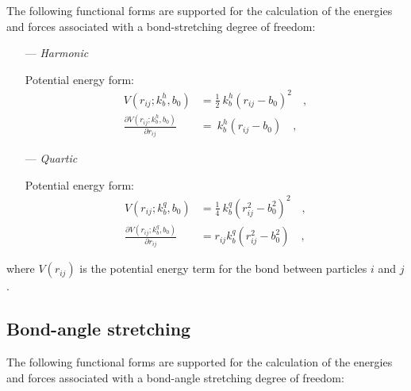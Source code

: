 \documentclass[10pt,a4paper,openany]{memoir}
\numberwithin{equation}{section}
\begin{document}
The following functional forms are supported for the calculation of
the energies and forces associated with a bond-stretching degree of freedom:\cite{GROMOS-doc,GROMACS-doc}

\begin{itemize}
\item [---] \textit{Harmonic}
  \par
  Potential energy form:
  \begin{align}
    \label{eq:harmonic-bond-energy}
    V(r_{ij}; k_b^h, b_0) & = \frac{1}{2} \ k_b^h (r_{ij} - b_0)^2 \quad , \\ \nonumber
    \frac{\partial V(r_{ij}; k_b^h, b_0)}{\partial r_{ij}} & = \ k_b^h (r_{ij} - b_0) \quad ,
  \end{align}
  
\item [---] \textit{Quartic}
  \par
  Potential energy form:
  \begin{align}
    \label{eq:quartic-bond-energy}
    V(r_{ij}; k_b^q, b_0) & = \frac{1}{4} \ k_b^q (r_{ij}^2 - b_0^2)^2 \quad , \\ \nonumber
    \frac{\partial V(r_{ij}; k_b^q, b_0)}{\partial r_{ij}} & = r_{ij} k_b^q (r_{ij}^2 - b_0^2) \quad ,
  \end{align}

\end{itemize}

\noindent
where $V(r_{ij})$ is the potential energy term for the bond between particles $i$ and $j$.

\subsection{Bond-angle stretching}
\label{sec:angle-terms}

The following functional forms are supported for the calculation of
the energies and forces associated with a bond-angle stretching degree of freedom:\cite{GROMOS-doc,GROMACS-doc}
\end{document}
